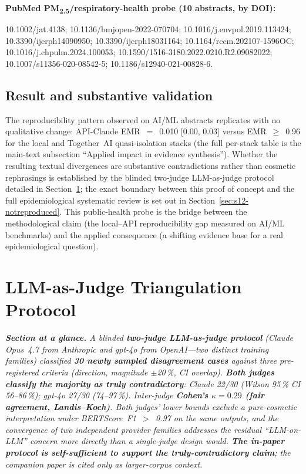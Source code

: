 \documentclass[11pt]{article}
\begin{document}
\textbf{PubMed PM\textsubscript{2.5}/respiratory-health probe (10 abstracts, by DOI):}
{\raggedright
10.1002/jat.4138; 10.1136/bmjopen-2022-070704; 10.1016/j.envpol.2019.113424; 10.3390/ijerph14090950; 10.3390/ijerph18031164; 10.1164/rccm.202107-1596OC; 10.1016/j.chpulm.2024.100053; 10.1590/1516-3180.2022.0210.R2.09082022; 10.1007/s11356-020-08542-5; 10.1186/s12940-021-00828-6.\par}

\subsection{Result and substantive validation}

The reproducibility pattern observed on AI/ML abstracts replicates with no qualitative change: API-Claude EMR~$=$~0.010 [0.00, 0.03] versus EMR~$\geq$~0.96 for the local and Together~AI quasi-isolation stacks (the full per-stack table is the main-text subsection ``Applied impact in evidence synthesis''). Whether the resulting textual divergences are substantive contradictions rather than cosmetic rephrasings is established by the blinded two-judge LLM-as-judge protocol detailed in Section~\ref{sec:s12}; the exact boundary between this proof of concept and the full epidemiological systematic review is set out in Section~\ref{sec:s12-notreproduced}. This public-health probe is the bridge between the methodological claim (the local--API reproducibility gap measured on AI/ML benchmarks) and the applied consequence (a shifting evidence base for a real epidemiological question).


\section{LLM-as-Judge Triangulation Protocol}\label{sec:s12}

\textit{\textbf{Section at a glance.} A blinded \textbf{two-judge LLM-as-judge protocol} (Claude Opus~4.7 from Anthropic and gpt-4o from OpenAI---two distinct training families) classified \textbf{30 newly sampled disagreement cases} against three pre-registered criteria (direction, magnitude $\pm$20\,\%, CI overlap). \textbf{Both judges classify the majority as truly contradictory}: Claude 22/30 (Wilson 95\,\% CI 56--86\,\%); gpt-4o 27/30 (74--97\,\%). Inter-judge \textbf{Cohen's $\kappa = 0.29$ (fair agreement, Landis--Koch)}. Both judges' lower bounds exclude a pure-cosmetic interpretation under BERTScore~F1~$>$~0.97 on the same outputs, and the convergence of two independent provider families addresses the residual ``LLM-on-LLM'' concern more directly than a single-judge design would. \textbf{The in-paper protocol is self-sufficient to support the truly-contradictory claim}; the companion paper is cited only as larger-corpus context.}
\end{document}
